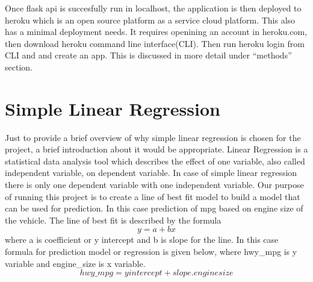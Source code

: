   Once flask api is succesfully run in localhost, the application is
  then deployed to heroku which is an open source platform as a 
  service cloud platform. This also has a minimal deployment needs.
  It requires openining an account in heroku.com, then download heroku
  command line interface(CLI). Then run heroku login from CLI and
  and create an app. This is discussed in more detail under ``methods'' section.
  
 
 
\section{Simple Linear Regression}
  Just to provide a brief overview of why simple linear regression is
  chosen for the project, a brief introduction about it would be
  appropriate. Linear Regression is a statistical data analysis tool
  which describes the effect of one variable, also called independent
  variable, on dependent variable. In case of simple linear regression
  there is only one dependent variable with one independent variable.
  Our purpose of running this project
  is to create a line of best fit model to build a model that can be used
  for prediction. In this case prediction of mpg based on engine size
  of the vehicle. The line of best fit is described by the
  formula \[y = a + bx\] where a is coefficient or y intercept and b is
  slope for the line. In this case formula for prediction model or
  regression is given below, where hwy\_mpg is y variable and
  engine\_size is x variable.
  \[hwy\_mpg = yintercept + slope.enginesize\] 
